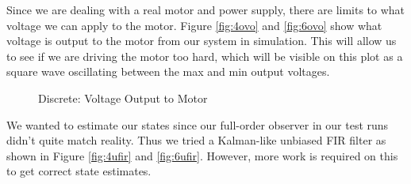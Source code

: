 \documentclass{article}
\begin{document}
Since we are dealing with a real motor and power supply, there are limits to what voltage we can apply to the motor. Figure \ref{fig:4ovo} and \ref{fig:6ovo} show what voltage is output to the motor from our system in simulation. This will allow us to see if we are driving the motor too hard, which will be visible on this plot as a square wave oscillating between the max and min output voltages.

\begin{figure}
\centering
{}
\caption{Discrete: Voltage Output to Motor}
\end{figure}

We wanted to estimate our states since our full-order observer in our test runs didn't quite match reality. Thus we tried a Kalman-like unbiased FIR filter as shown in Figure \ref{fig:4ufir} and \ref{fig:6ufir}. However, more work is required on this to get correct state estimates.
\end{document}
